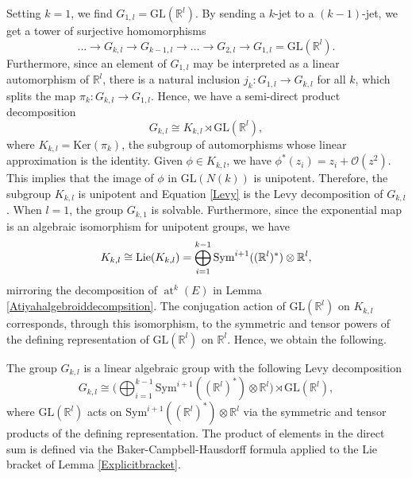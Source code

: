 \documentclass[10pt]{amsart}
\DeclareMathOperator{\at}{at}
\numberwithin{theoremalpha}{section}
\numberwithin{equation}{section}
\numberwithin{definition}{section}
\numberwithin{theorem}{section}
\numberwithin{proposition}{section}
\numberwithin{lemma}{section}
\numberwithin{example}{section}
\numberwithin{remark}{section}
\numberwithin{corollary}{section}
\numberwithin{question}{section}
\numberwithin{problem}{section}
\numberwithin{assumption}{section}
\theoremstyle{named}
\numberwithin{equation}{section}
\begin{document}
Setting $k = 1$, we find $G_{1,l} = \mathrm{GL}(\mathbb{R}^l)$. By sending a $k$-jet to a $(k-1)$-jet, we get a tower of surjective homomorphisms 
\begin{equation} \label{tower}
... \to G_{k,l} \to G_{k-1,l} \to ... \to G_{2,l} \to G_{1,l} = \mathrm{GL}(\mathbb{R}^l). 
\end{equation}
Furthermore, since an element of $G_{1,l}$ may be interpreted as a linear automorphism of $\mathbb{R}^l$, there is a natural inclusion $j_{k}: G_{1,l} \to G_{k,l}$ for all $k$, which splits the map $\pi_{k} : G_{k,l} \to G_{1,l}$. Hence, we have a semi-direct product decomposition 
\begin{equation}\label{Levy}
G_{k,l} \cong K_{k,l} \rtimes \mathrm{GL}(\mathbb{R}^l),
\end{equation}
where $K_{k,l} = \mathrm{Ker}(\pi_{k})$, the subgroup of automorphisms whose linear approximation is the identity. Given $\phi \in K_{k,l}$, we have $\phi^{*}(z_{i}) = z_{i} + \mathcal{O}(z^2)$. This implies that the image of $\phi$ in $\mathrm{GL}(N(k))$ is unipotent. Therefore, the subgroup $K_{k,l}$ is unipotent and Equation \ref{Levy} is the Levy decomposition of $G_{k,l}$. When $l = 1$, the group $G_{k,1}$ is solvable. Furthermore, since the exponential map is an algebraic isomorphism for unipotent groups, we have 
\[
K_{k,l} \cong {\rm Lie}(K_{k,l}) = \bigoplus_{i = 1}^{k-1} \mathrm{Sym}^{i+1}( (\mathbb{R}^l)^* ) \otimes \mathbb{R}^l,
\]
mirroring the decomposition of $\at^{k}(E)$ in Lemma \ref{Atiyahalgebroiddecompsition}. The conjugation action of $\mathrm{GL}(\mathbb{R}^l)$ on $K_{k,l}$ corresponds, through this isomorphism, to the symmetric and tensor powers of the defining representation of $\mathrm{GL}(\mathbb{R}^l)$ on $\mathbb{R}^l$. Hence, we obtain the following. 

\begin{lemma} \label{lem:Gkldecomp}
The group $G_{k,l}$ is a linear algebraic group with the following Levy decomposition 
\[
G_{k,l} \cong \big( \bigoplus_{i = 1}^{k-1} \mathrm{Sym}^{i+1}( (\mathbb{R}^l)^* ) \otimes \mathbb{R}^l \big) \rtimes \mathrm{GL}(\mathbb{R}^l),
\]
where $\mathrm{GL}(\mathbb{R}^l)$ acts on $ \mathrm{Sym}^{i+1}( (\mathbb{R}^l)^* ) \otimes \mathbb{R}^l $ via the symmetric and tensor products of the defining representation. The product of elements in the direct sum is defined via the Baker-Campbell-Hausdorff formula applied to the Lie bracket of Lemma \ref{Explicitbracket}. 
\end{lemma} 
\end{document}
